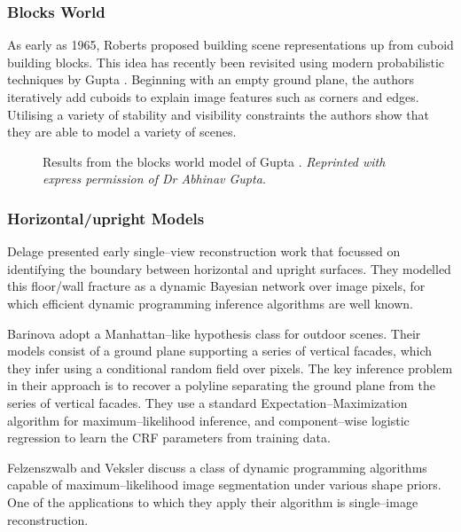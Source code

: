 \subsubsection{Blocks World}

As early as 1965, Roberts \cite{Roberts65} proposed building scene
representations up from cuboid building blocks. This idea has recently
been revisited using modern probabilistic techniques by Gupta \etal
\cite{Gupta10}. Beginning with an empty ground plane, the authors
iteratively add cuboids to explain image features such as corners and
edges. Utilising a variety of stability and visibility constraints
the authors show that they are able to model a variety of scenes.

\begin{figure}[tb]
  \centering
  \caption{Results from the blocks world model of Gupta \etal
    \cite{Gupta10}.
    \textit{Reprinted with express permission of Dr Abhinav Gupta.}
  }
  \label{fig:gupta-result}
\end{figure}

\subsubsection{Horizontal/upright Models}

Delage \etal \cite{Delage2006} presented early single--view
reconstruction work that focussed on identifying the boundary between
horizontal and upright surfaces. They modelled this floor/wall
fracture as a dynamic Bayesian network over image pixels, for which
efficient dynamic programming inference algorithms are well known.

Barinova \etal \cite{Barinova08} adopt a Manhattan--like hypothesis
class for outdoor scenes. Their models consist of a ground plane
supporting a series of vertical facades, which they infer using a
conditional random field over pixels. The key inference problem in
their approach is to recover a polyline separating the ground plane
from the series of vertical facades. They use a standard
Expectation--Maximization algorithm for maximum--likelihood inference,
and component--wise logistic regression to learn the CRF parameters
from training data.

Felzenszwalb and Veksler \cite{Felzenszwalb2010} discuss a class of
dynamic programming algorithms capable of maximum--likelihood
image segmentation under various shape priors. One of the applications
to which they apply their algorithm is single--image reconstruction.

